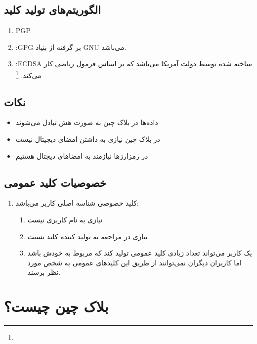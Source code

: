\documentclass[10pt, a4paper]{article}
\begin{document}
\subsection*{الگوریتم‌های تولید کلید}

\begin{enumerate}
    \item PGP
    \item :GPG بر گرفته از بنیاد GNU می‌باشد.
    \item :ECDSA ساخته شده توسط دولت آمریکا می‌باشد که بر اساس فرمول ریاضی کار
    می‌کند. \footnote{}
\end{enumerate}

\subsection*{نکات}

\begin{itemize}
    \item داده‌ها در بلاک چین به صورت هش تبادل می‌شوند
    \item در بلاک چین نیازی به داشتن امضای دیجیتال نیست
    \item در رمزارز‌ها نیازمند به امضا‌های دیجتال هستیم
\end{itemize}

\subsection{خصوصیات کلید عمومی}

\begin{enumerate}
    \item کلید خصوصی شناسه اصلی کاربر می‌باشد:
    \begin{enumerate}
        \item نیازی به نام کاربری نیست
        \item نیازی در مراجعه به تولید کننده کلید نسیت
        \item یک کاربر می‌تواند تعداد زیادی کلید عمومی تولید کند که مربوط به
        خودش باشد اما کاربران دیگران نمی‌توانند از طریق این کلید‌های عمومی به
        شخص مورد نظر برسند.
    \end{enumerate}
\end{enumerate}

\section{بلاک چین چیست؟}
\end{document}
